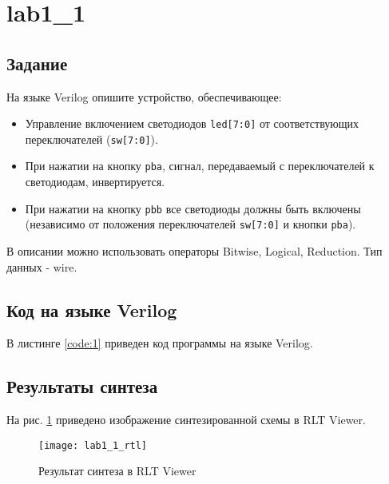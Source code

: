 





\tableofcontents
\listoffigures
\lstlistoflistings
\newpage

\section{lab1\_1}

\subsection{Задание}

На языке Verilog опишите устройство, обеспечивающее:
\begin{itemize}
	\item Управление включением светодиодов \verb|led[7:0]| от соответствующих переключателей (\verb|sw[7:0]|).
	\item При нажатии на кнопку \verb|pba|, сигнал, передаваемый с переключателей к светодиодам, инвертируется.
	\item При нажатии на кнопку \verb|pbb| все светодиоды должны быть включены (независимо от положения переключателей \verb|sw[7:0]| и кнопки \verb|pba|).
\end{itemize}

В описании можно использовать операторы Bitwise, Logical, Reduction. Тип данных - wire.

\subsection{Код на языке Verilog}

В листинге \ref{code:1} приведен код программы на языке Verilog.



\subsection{Результаты синтеза}

На рис. \ref{fig:lab1_1_rtl} приведено изображение синтезированной схемы в RLT Viewer.

\begin{figure}[H]
\begin{center}
	\texttt{[image: lab1\_1\_rtl]}
	\caption{Результат синтеза в RLT Viewer}
	\label{fig:lab1_1_rtl}
\end{center}
\end{figure}


